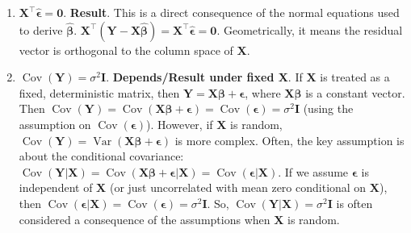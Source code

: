 \documentclass[11pt, a4paper]{article}
\DeclareMathOperator{\Var}{\mathrm{Var}}         %
\DeclareMathOperator{\Cov}{\mathrm{Cov}}         %
\theoremstyle{definition}
\theoremstyle{remark}
\newcommand{\mat}[1]{\mathbf{#1}}       %
\newcommand{\vect}[1]{\bm{#1}}          %
\newcommand{\transpose}{^{\top}}        %
\begin{document}
\begin{enumerate}
    \item $\mat{X}\transpose \hat{\vect{\epsilon}} = \vect{0}$.
        \textbf{Result}. This is a direct consequence of the normal equations used to derive $\hat{\vect{\beta}}$. $\mat{X}\transpose(\vect{Y} - \mat{X}\hat{\vect{\beta}}) = \mat{X}\transpose \hat{\vect{\epsilon}} = \vect{0}$. Geometrically, it means the residual vector is orthogonal to the column space of $\mat{X}$.
    \item $\Cov(\vect{Y}) = \sigma^2 \mat{I}$.
        \textbf{Depends/Result under fixed X}. If $\mat{X}$ is treated as a fixed, deterministic matrix, then $\vect{Y} = \mat{X}\vect{\beta} + \vect{\epsilon}$, where $\mat{X}\vect{\beta}$ is a constant vector. Then $\Cov(\vect{Y}) = \Cov(\mat{X}\vect{\beta} + \vect{\epsilon}) = \Cov(\vect{\epsilon}) = \sigma^2 \mat{I}$ (using the assumption on $\Cov(\vect{\epsilon})$). However, if $\mat{X}$ is random, $\Cov(\vect{Y}) = \Var(\mat{X}\vect{\beta} + \vect{\epsilon})$ is more complex. Often, the key assumption is about the conditional covariance: $\Cov(\vect{Y} | \mat{X}) = \Cov(\mat{X}\vect{\beta} + \vect{\epsilon} | \mat{X}) = \Cov(\vect{\epsilon} | \mat{X})$. If we assume $\vect{\epsilon}$ is independent of $\mat{X}$ (or just uncorrelated with mean zero conditional on $\mat{X}$), then $\Cov(\vect{\epsilon} | \mat{X}) = \Cov(\vect{\epsilon}) = \sigma^2 \mat{I}$. So, $\Cov(\vect{Y} | \mat{X}) = \sigma^2 \mat{I}$ is often considered a consequence of the assumptions when $\mat{X}$ is random.
\end{enumerate}
\end{document}
